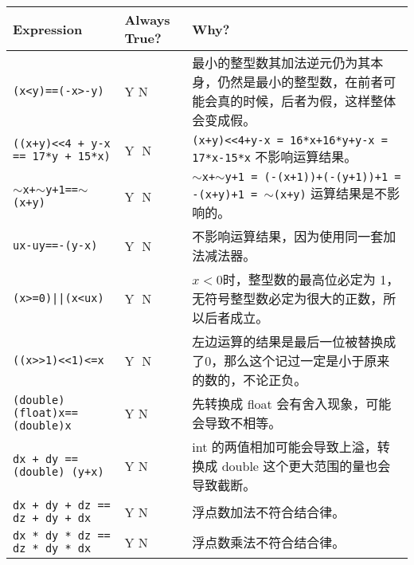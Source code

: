 \documentclass[12pt,a4paper]{article}
\newenvironment{problems}{\begin{list}{}{\renewcommand{\makelabel}[1]{\textbf{##1}.\hfil}}}{\end{list}}
\begin{document}
\begin{problems}
    \begin{tabular}{l|l|p{6cm}}
        \hline
        Expression & Always True? & Why?\\
        \hline
        \texttt{(x<y)==(-x>-y)} & Y \textcircled{N} & 最小的整型数其加法逆元仍为其本身，仍然是最小的整型数，在前者可能会真的时候，后者为假，这样整体会变成假。\\
        \texttt{((x+y)<<4 + y-x == 17*y + 15*x)} & \textcircled{Y} N & \texttt{(x+y)<<4+y-x = 16*x+16*y+y-x = 17*x-15*x} 不影响运算结果。\\
        \texttt{$\sim$x+$\sim$y+1==$\sim$(x+y)} & \textcircled{Y} N & \texttt{$\sim$x+$\sim$y+1 = (-(x+1))+(-(y+1))+1 = -(x+y)+1 = $\sim$(x+y)} 运算结果是不影响的。\\
        \texttt{ux-uy==-(y-x)} & \textcircled{Y} N & 不影响运算结果，因为使用同一套加法减法器。\\
        \texttt{(x>=0)||(x<ux)} & \textcircled{Y} N & $x<0$时，整型数的最高位必定为 1，无符号整型数必定为很大的正数，所以后者成立。\\
        \texttt{((x>>1)<<1)<=x} & \textcircled{Y} N & 左边运算的结果是最后一位被替换成了0，那么这个记过一定是小于原来的数的，不论正负。\\
        \texttt{(double)(float)x==(double)x} & Y \textcircled{N} & 先转换成 float 会有舍入现象，可能会导致不相等。\\
        \texttt{dx + dy == (double) (y+x)} & Y \textcircled{N} & int 的两值相加可能会导致上溢，转换成 double 这个更大范围的量也会导致截断。\\
        \texttt{dx + dy + dz == dz + dy + dx} & Y \textcircled{N} & 浮点数加法不符合结合律。\\
        \texttt{dx * dy * dz == dz * dy * dx} & Y \textcircled{N} & 浮点数乘法不符合结合律。\\
        \hline
    \end{tabular}

\end{problems}
\end{document}
